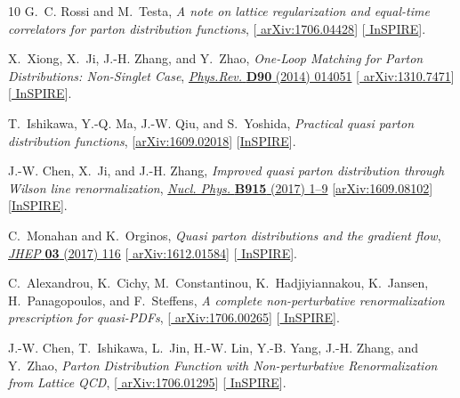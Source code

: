 \begin{thebibliography}{10}
G.~C. Rossi and M.~Testa,
{\it {A note on lattice regularization and equal-time correlators for parton
  distribution functions}},  [\href{http://arxiv.org/abs/1706.04428}{{\ttfamily
  arXiv:1706.04428}}] [\href{http://inspirehep.net/record/1605132}{{\ttfamily
  InSPIRE}}].

X.~Xiong, X.~Ji, J.-H. Zhang, and Y.~Zhao, {\it {One-Loop Matching for Parton
  Distributions: Non-Singlet Case}},
\href{http://dx.doi.org/10.1103/PhysRevD.90.014051}{{\em Phys.Rev.} {\bfseries
  D90} (2014) 014051} [\href{http://arxiv.org/abs/1310.7471}{{\ttfamily
  arXiv:1310.7471}}] [\href{http://inspirehep.net/record/1262353}{{\ttfamily
  InSPIRE}}].

T.~Ishikawa, Y.-Q. Ma, J.-W. Qiu, and S.~Yoshida,
{\it {Practical quasi parton distribution functions}},
  [\href{http://arxiv.org/abs/1609.02018}{{\ttfamily arXiv:1609.02018}}]
  [\href{http://inspirehep.net/record/1485578}{{\ttfamily InSPIRE}}].

J.-W. Chen, X.~Ji, and J.-H. Zhang, {\it {Improved quasi parton distribution
  through Wilson line renormalization}},
\href{http://dx.doi.org/10.1016/j.nuclphysb.2016.12.004}{{\em Nucl. Phys.}
  {\bfseries B915} (2017) 1--9}
  [\href{http://arxiv.org/abs/1609.08102}{{\ttfamily arXiv:1609.08102}}]
  [\href{http://inspirehep.net/record/1488113}{{\ttfamily InSPIRE}}].

C.~Monahan and K.~Orginos, {\it {Quasi parton distributions and the gradient
  flow}},
\href{http://dx.doi.org/10.1007/JHEP03(2017)116}{{\em JHEP} {\bfseries 03}
  (2017) 116} [\href{http://arxiv.org/abs/1612.01584}{{\ttfamily
  arXiv:1612.01584}}] [\href{http://inspirehep.net/record/1501937}{{\ttfamily
  InSPIRE}}].

C.~Alexandrou, K.~Cichy, M.~Constantinou, K.~Hadjiyiannakou, K.~Jansen,
  H.~Panagopoulos, and F.~Steffens,
{\it {A complete non-perturbative renormalization prescription for
  quasi-PDFs}},  [\href{http://arxiv.org/abs/1706.00265}{{\ttfamily
  arXiv:1706.00265}}] [\href{http://inspirehep.net/record/1602174}{{\ttfamily
  InSPIRE}}].

J.-W. Chen, T.~Ishikawa, L.~Jin, H.-W. Lin, Y.-B. Yang, J.-H. Zhang, and
  Y.~Zhao,
{\it {Parton Distribution Function with Non-perturbative Renormalization from
  Lattice QCD}},  [\href{http://arxiv.org/abs/1706.01295}{{\ttfamily
  arXiv:1706.01295}}] [\href{http://inspirehep.net/record/1602626}{{\ttfamily
  InSPIRE}}].


\end{thebibliography}
